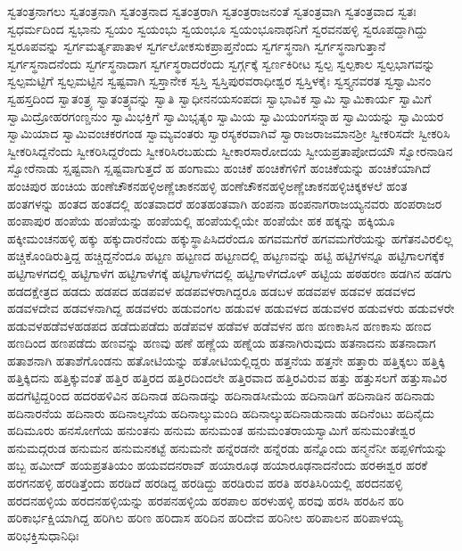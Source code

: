 {ಸ್ವತಂತ್ರನಾಗಲು
ಸ್ವತಂತ್ರನಾಗಿ
ಸ್ವತಂತ್ರನಾದ
ಸ್ವತಂತ್ರರಾಗಿ
ಸ್ವತಂತ್ರರಾಜನಂತೆ
ಸ್ವತಂತ್ರವಾಗಿ
ಸ್ವತಂತ್ರವಾದ
ಸ್ವತಃ
ಸ್ವಧರ್ಮದಿಂದ
ಸ್ವಭಾನು
ಸ್ವಯಂ
ಸ್ವಯಂಭು
ಸ್ವಯಂಭೂ
ಸ್ವಯಂಭೂನಾಥನಿಗೆ
ಸ್ವರವನಹಳ್ಳಿ
ಸ್ವರೂಪದ್ದಾಗಿದ್ದು
ಸ್ವರೂಪವನ್ನು
ಸ್ವರ್ಗಮರ್ತ್ಯಪಾತಾಳ
ಸ್ವರ್ಗಲೋಕಸುಕಪ್ರಾಪ್ತನೆಂದು
ಸ್ವರ್ಗಸ್ಥನಾಗಿ
ಸ್ವರ್ಗಸ್ಥನಾಗುತ್ತಾನೆ
ಸ್ವರ್ಗಸ್ಥನಾದನೆಂದು
ಸ್ವರ್ಗಸ್ಥನಾದಾಗ
ಸ್ವರ್ಗಸ್ಥರಾದರೆಂದು
ಸ್ವರ್ಗ್ಗಕ್ಕೆ
ಸ್ವರ್ಣಕಿರೀಟ
ಸ್ವಲ್ಪ
ಸ್ವಲ್ಪಕಾಲ
ಸ್ವಲ್ಪಭಾಗವನ್ನು
ಸ್ವಲ್ಪಮಟ್ಟಿಗೆ
ಸ್ವಲ್ಪಮಟ್ಟಿನ
ಸ್ವಷ್ಟವಾಗಿ
ಸ್ವಸ್ತಾನೇಕ
ಸ್ವಸ್ತಿ
ಸ್ವಸ್ತಿಪುರವರಾಧೀಶ್ವರ
ಸ್ವಸ್ತಿಳಕೈಃ
ಸ್ವಸ್ತ್ಯನವರತ
ಸ್ವಸ್ವಾಮಿನಂ
ಸ್ವಹಸ್ತದಿಂದ
ಸ್ವಾತಂತ್ರ್ಯ
ಸ್ವಾತಂತ್ರ್ಯವನ್ನು
ಸ್ವಾತಿ
ಸ್ವಾಧೀನನಯಸಂಪದಃ
ಸ್ವಾಭಾವಿಕ
ಸ್ವಾಮಿ
ಸ್ವಾಮಿಕಾರ್ಯ
ಸ್ವಾಮಿಗೆ
ಸ್ವಾಮಿದ್ರೋಹರಗಂಣ್ಡನುಂ
ಸ್ವಾಮಿಭಕ್ತಿಗೆ
ಸ್ವಾಮಿಭೃತ್ಯಂ
ಸ್ವಾಮಿಯ
ಸ್ವಾಮಿಯಂಗಸನ್ನಾಹ
ಸ್ವಾಮಿಯನ್ನು
ಸ್ವಾಮಿಯರ
ಸ್ವಾಮಿಯಾದ
ಸ್ವಾಮಿವಂಚಕರಗಂಡ
ಸ್ವಾಮ್ಯವಂತರು
ಸ್ವಾರಸ್ಯಕರವಾಗಿವೆ
ಸ್ವಾರಾಜರಾಜಮಾನಶ್ರೀ
ಸ್ವೀಕರಿಸದೇ
ಸ್ವೀಕರಿಸಿ
ಸ್ವೀಕರಿಸಿದ್ದನೆಂದು
ಸ್ವೀಕರಿಸಿದ್ದರೆಂದು
ಸ್ವೀಕರಿಸಿರಬಹುದು
ಸ್ವೀಕಾರಸಾರೋದಯ
ಸ್ವೀಯಪ್ರತಾಪೋದಯೌ
ಸ್ವೋರನಾಡಿನ
ಸ್ವೋರೆನಾಡು
ಸ್ಷಷ್ಟವಾಗಿ
ಸ್ಷಷ್ಟವಾಗುತ್ತದೆ
ಹ
ಹಂಗಾಮು
ಹಂಚಿಕೆ
ಹಂಚಿಕೆಗಳಿಗೆ
ಹಂಚಿಕೆಯನ್ನು
ಹಂಚಿಕೆಯಾಗಿದೆ
ಹಂಚಿಪುರ
ಹಂಚಿಯ
ಹಂಣೆಚೌಕನಹಳ್ಳಿಅಣ್ಣೆಚಾಕನಹಳ್ಳಿ
ಹಂಣೆಚೌಕನಹಳ್ಳಿಅಣ್ಣೆಚಾಕನಹಳ್ಳಿಚಿಕ್ಕಕಳಲೆ
ಹಂತ
ಹಂತಗಳನ್ನು
ಹಂತದ
ಹಂತದಲ್ಲಿ
ಹಂತವಾದರೆ
ಹಂತಹಂತವಾಗಿ
ಹಂಪನಾ
ಹಂಪನಾಗರಾಜಯ್ಯನವರು
ಹಂಪರಾಜರ
ಹಂಪಾಪುರ
ಹಂಪೆಯ
ಹಂಪೆಯನ್ನು
ಹಂಪೆಯಲ್ಲಿ
ಹಂಪೆಯಲ್ಲಿಯೇ
ಹಂಪೆಯೇ
ಹಕ
ಹಕ್ಕನ್ನು
ಹಕ್ಕಿಯೂ
ಹಕ್ಕೀಮಂಚನಹಳ್ಳಿ
ಹಕ್ಕು
ಹಕ್ಕುದಾರನೆಂದು
ಹಕ್ಕುಸ್ಥಾಪಿಸಿದರೆಂದೂ
ಹಗವಮಗೆರೆ
ಹಗವಮಗೆರೆಯನ್ನು
ಹಗೆತನವಿರಲಿಲ್ಲ
ಹಚ್ಚಿಕೊಂಡಿರುತ್ತಿದ್ದ
ಹಚ್ಚಿದ್ದನೆಂದೂ
ಹಟ್ಟಣ
ಹಟ್ಟಣದ
ಹಟ್ಟಣದಲ್ಲಿ
ಹಟ್ಟಣವನ್ನು
ಹಟ್ಟಿ
ಹಟ್ಟಿಗಳನ್ನೂ
ಹಟ್ಟಿಗಾಲಗಕ್ಕೆಕ
ಹಟ್ಟಿಗಾಳಗದಲ್ಲಿ
ಹಟ್ಟಿಗಾಳೆಗ
ಹಟ್ಟಿಗಾಳೆಗಕ್ಕೆ
ಹಟ್ಟಿಗಾಳೆಗದಲ್ಲಿ
ಹಟ್ಟಿಗಾಳೆಗದೊಳ್
ಹಟ್ಟಿಯ
ಹಠಹರಣ
ಹಡಗಿನ
ಹಡಗು
ಹಡದಕ್ಷೇತ್ರದ
ಹಡದು
ಹಡಪದ
ಹಡಪವಳ
ಹಡಪವಳರಾಗಿದ್ದರೂ
ಹಡಬಳ
ಹಡವಪಳ
ಹಡವಳ
ಹಡವಳದ
ಹಡವಳದೇವ
ಹಡವಳನಾಗಿದ್ದ
ಹಡವಳರು
ಹಡುವಂಗಲ
ಹಡುವಳ
ಹಡುವಳದ
ಹಡುವಳರ
ಹಡುವಳರು
ಹಡುವಳರೇ
ಹಡುವಳಹಡೆವಳಹಡಪದ
ಹಡೆದುಪಡೆದು
ಹಡೆಪವಳ
ಹಡೆವಳ
ಹಡೆವಳನ
ಹಣ
ಹಣಕಾಸಿನ
ಹಣಕಾಸು
ಹಣದ
ಹಣದಿಂದ
ಹಣಪಡೆದು
ಹಣವನ್ನು
ಹಣವು
ಹಣೆ
ಹಣ್ಣೆಯ
ಹಣ್ನೆಯ
ಹತನಾಗಿರುವುದು
ಹತನಾದನು
ಹತನಾದಾಗ
ಹತಾಶನಾಗಿ
ಹತಾಶೆಗೊಂಡನು
ಹತೋಟಿಯನ್ನು
ಹತೋಟಿಯಲ್ಲಿದ್ದರು
ಹತ್ತನೆಯ
ಹತ್ತನೇ
ಹತ್ತಾರು
ಹತ್ತಿಕ್ಕಲು
ಹತ್ತಿಕ್ಕಿ
ಹತ್ತಿಕ್ಕಿದನು
ಹತ್ತಿಕ್ಕುವಂತೆ
ಹತ್ತಿರ
ಹತ್ತಿರದ
ಹತ್ತಿರದಿಂದಲೇ
ಹತ್ತಿರವಾದ
ಹತ್ತಿರವಿರುವ
ಹತ್ತು
ಹತ್ತುಸಲಗೆ
ಹತ್ತುಸಾವಿರ
ಹದಗೆಟ್ಟಿದ್ದರಿಂದ
ಹದರಹಳಿವಿನ
ಹದಿನಾಡ
ಹದಿನಾಡನ್ನು
ಹದಿನಾಡಸೀಮೆಯ
ಹದಿನಾಡಿಗೆ
ಹದಿನಾಡಿನ
ಹದಿನಾಡು
ಹದಿನಾರನೆಯ
ಹದಿನಾರು
ಹದಿನಾಲ್ಕನೆಯ
ಹದಿನಾಲ್ಕುಮಂದಿ
ಹದಿನಾಲ್ಕುಹದಿನಾಡುನಾಡು
ಹದಿನೆಂಟು
ಹದಿನೈದು
ಹದಿಮೂರು
ಹನಸೋಗೆಯ
ಹನುಂತನು
ಹನುಮ
ಹನುಮಂತ
ಹನುಮಂತರಾಯಸ್ವಾಮಿಗೆ
ಹನುಮಂತೇಶ್ವರ
ಹನುಮದ್ಗರುಡ
ಹನುಮನ
ಹನುಮನಕಟ್ಟೆ
ಹನುಮನೇ
ಹನ್ನೆರಡನೇ
ಹನ್ನೆರಡು
ಹನ್ನೊಂದು
ಹನ್ಮನೆನೀ
ಹಪ್ಪಳಿಗೆಯನ್ನು
ಹಬ್ಬ
ಹಮೀದ್
ಹಯಪ್ರತತಿಯಂ
ಹಯವದನರಾವ್
ಹಯಾರೂಢ
ಹಯಾರೂಢನಾದನೆಂದು
ಹರಈಶ್ವರ
ಹರಕೆ
ಹರಗನಹಳ್ಳಿ
ಹರಡಿತ್ತೆಂದು
ಹರಡಿದೆ
ಹರಡಿದ್ದ
ಹರಡಿದ್ದು
ಹರಡಿರುವ
ಹರತಿ
ಹರತಿಸಿರಿಯಲ್ಲಿ
ಹರದನಹಳ್ಳಿ
ಹರದನಹಳ್ಳಿಯ
ಹರದನಹಳ್ಳಿಯನ್ನು
ಹರಪನಹಳ್ಳಿಯ
ಹರಪಾಲ
ಹರಳುಹಳ್ಳಿ
ಹರವು
ಹರಸಿ
ಹರಹಿನ
ಹರಿ
ಹರಿಕಾರ್ಭಕ್ಷಿಯಾಗಿದ್ದ
ಹರಿಗಿಲ
ಹರಿಣ
ಹರಿದಾಸ
ಹರಿದಿನ
ಹರಿದೇವ
ಹರಿನೀಲ
ಹರಿಪಾಲನ
ಹರಿಪಾಳಯ್ಯ
ಹರಿಭಕ್ತಿಸುಧಾನಿಧಿಃ
}
